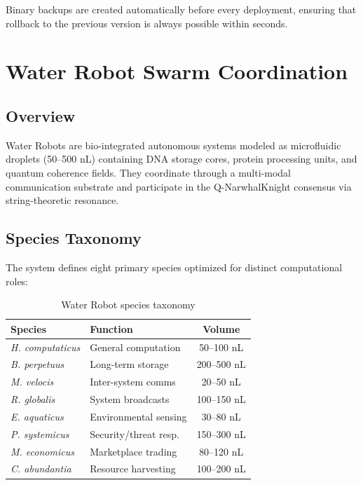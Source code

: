 \documentclass[11pt,a4paper,twocolumn]{article}
\begin{document}
Binary backups are created automatically before every deployment, ensuring that
rollback to the previous version is always possible within seconds.

\section{Water Robot Swarm Coordination}
\label{sec:waterrobots}

\subsection{Overview}

Water Robots are bio-integrated autonomous systems modeled as microfluidic droplets
(50--500 nL) containing DNA storage cores, protein processing units, and quantum
coherence fields. They coordinate through a multi-modal communication substrate
and participate in the Q-NarwhalKnight consensus via string-theoretic resonance.

\subsection{Species Taxonomy}

The system defines eight primary species optimized for distinct computational roles:

\begin{table}[H]
\centering
\caption{Water Robot species taxonomy}
\label{tab:species}
\scriptsize
\begin{tabularx}{\columnwidth}{lXc}
\toprule
\textbf{Species} & \textbf{Function} & \textbf{Volume} \\
\midrule
\textit{H. computaticus} & General computation & 50--100 nL \\
\textit{B. perpetuus}    & Long-term storage   & 200--500 nL \\
\textit{M. velocis}      & Inter-system comms  & 20--50 nL \\
\textit{R. globalis}     & System broadcasts   & 100--150 nL \\
\textit{E. aquaticus}    & Environmental sensing & 30--80 nL \\
\textit{P. systemicus}   & Security/threat resp. & 150--300 nL \\
\textit{M. economicus}   & Marketplace trading & 80--120 nL \\
\textit{C. abundantia}   & Resource harvesting & 100--200 nL \\
\bottomrule
\end{tabularx}
\end{table}
\end{document}
